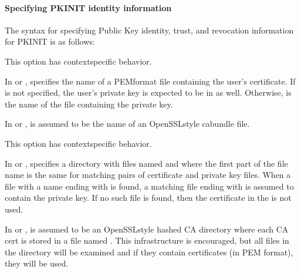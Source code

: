 \documentclass[letterpaper,10pt,english]{sphinxmanual}
\begin{document}
\paragraph{Specifying PKINIT identity information}
\label{\detokenize{admin/conf_files/krb5_conf:specifying-pkinit-identity-information}}\label{\detokenize{admin/conf_files/krb5_conf:pkinit-identity}}
\sphinxAtStartPar
The syntax for specifying Public Key identity, trust, and revocation
information for PKINIT is as follows:
\begin{description}
\sphinxAtStartPar
This option has context\sphinxhyphen{}specific behavior.

\sphinxAtStartPar
In  or , 
specifies the name of a PEM\sphinxhyphen{}format file containing the user’s
certificate.  If  is not specified, the user’s
private key is expected to be in  as well.  Otherwise,
 is the name of the file containing the private key.

\sphinxAtStartPar
In  or ,  is assumed to
be the name of an OpenSSL\sphinxhyphen{}style ca\sphinxhyphen{}bundle file.

\sphinxAtStartPar
This option has context\sphinxhyphen{}specific behavior.

\sphinxAtStartPar
In  or , 
specifies a directory with files named  and 
where the first part of the file name is the same for matching
pairs of certificate and private key files.  When a file with a
name ending with  is found, a matching file ending with
 is assumed to contain the private key.  If no such file
is found, then the certificate in the  is not used.

\sphinxAtStartPar
In  or ,  is assumed to
be an OpenSSL\sphinxhyphen{}style hashed CA directory where each CA cert is
stored in a file named .  This infrastructure
is encouraged, but all files in the directory will be examined and
if they contain certificates (in PEM format), they will be used.


\end{description}
\end{document}
